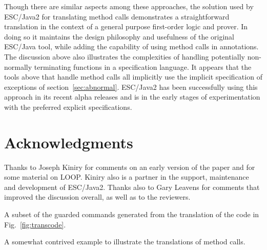 \documentclass{sig-alternate2}
\begin{document}
Though there are similar aspects among these approaches, the solution
used by ESC/Java2 for translating method calls demonstrates a
straightforward translation in the context of a general purpose first-order logic
and prover.  In doing so it maintains the design philosophy and
usefulness of the original ESC/Java tool, while adding the capability of using method
calls in annotations.  The discussion above also illustrates the
complexities of handling potentially non-normally terminating functions in a 
specification language.  It appears that the tools above that handle method calls all
implicitly use the implicit specification of exceptions of section~\ref{sec:abnormal}.  ESC/Java2 has
been successfully using this approach in its recent alpha releases and is in
the early stages of experimentation with the preferred explicit specifications.

\section{Acknowledgments}

Thanks to Joseph Kiniry for comments on an early version of the paper and
for some material on LOOP.  Kiniry also is a partner in the support, maintenance and
development of ESC/Java2.  Thanks also to Gary Leavens for
comments that improved the discussion overall, as well as to the reviewers.

%

%

  


%
%

\appendix

\begin{BFIGUREDB}
\scriptsize

\caption{A subset of the guarded commands generated from the translation of the code in Fig.~\ref{fig:transcode}.}
\label{fig:trans}
\end{BFIGUREDB}

\begin{BFIGURET}

\caption{A somewhat contrived example to illustrate the translations of method calls.}
\label{fig:transcode}
\end{BFIGURET}
\end{document}
